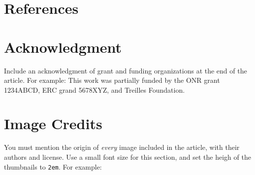 \documentclass{ipol}
\begin{document}
\section{References}




\section*{Acknowledgment}

Include an acknowledgment of grant and funding organizations at the
end of the article. For example: This work was partially funded by the
ONR grant 1234ABCD, ERC grand 5678XYZ, and Treilles Foundation.

\section*{Image Credits}

You must mention the origin of \emph{every} image included in the article,
with their authors and license. Use a small font size for this
section, and set the heigh of the thumbnails to \verb|2em|. For example:\\

\end{document}
